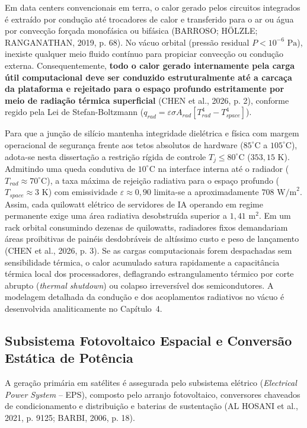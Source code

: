 Em data centers convencionais em terra, o calor gerado pelos circuitos integrados é extraído por condução até trocadores de calor e transferido para o ar ou água por convecção forçada monofásica ou bifásica (BARROSO; HÖLZLE; RANGANATHAN, 2019, p. 68). No vácuo orbital (pressão residual $P < 10^{-6}\text{ Pa}$), inexiste qualquer meio fluido contínuo para propiciar convecção ou condução externa. Consequentemente, \textbf{todo o calor gerado internamente pela carga útil computacional deve ser conduzido estruturalmente até a carcaça da plataforma e rejeitado para o espaço profundo estritamente por meio de radiação térmica superficial} (CHEN et al., 2026, p. 2), conforme regido pela Lei de Stefan-Boltzmann ($q_{rad} = \varepsilon \sigma A_{rad} [T_{rad}^4 - T_{space}^4]$).

Para que a junção de silício mantenha integridade dielétrica e física com margem operacional de segurança frente aos tetos absolutos de hardware ($85^\circ\text{C}$ a $105^\circ\text{C}$), adota-se nesta dissertação a restrição rígida de controle $T_j \le 80^\circ\text{C}$ ($353{,}15\text{ K}$). Admitindo uma queda condutiva de $10^\circ\text{C}$ na interface interna até o radiador ($T_{rad} \approx 70^\circ\text{C}$), a taxa máxima de rejeição radiativa para o espaço profundo ($T_{space} \approx 3\text{ K}$) com emissividade $\varepsilon \approx 0{,}90$ limita-se a aproximadamente $708\text{ W/m}^2$. Assim, cada quilowatt elétrico de servidores de IA operando em regime permanente exige uma área radiativa desobstruída superior a $1{,}41\text{ m}^2$. Em um rack orbital consumindo dezenas de quilowatts, radiadores fixos demandariam áreas proibitivas de painéis desdobráveis de altíssimo custo e peso de lançamento (CHEN et al., 2026, p. 3). Se as cargas computacionais forem despachadas sem sensibilidade térmica, o calor acumulado satura rapidamente a capacitância térmica local dos processadores, deflagrando estrangulamento térmico por corte abrupto (\textit{thermal shutdown}) ou colapso irreversível dos semicondutores. A modelagem detalhada da condução e dos acoplamentos radiativos no vácuo é desenvolvida analiticamente no Capítulo~4.

\subsection{Subsistema Fotovoltaico Espacial e Conversão Estática de Potência}

A geração primária em satélites é assegurada pelo subsistema elétrico (\textit{Electrical Power System} -- EPS), composto pelo arranjo fotovoltaico, conversores chaveados de condicionamento e distribuição e baterias de sustentação (AL HOSANI et al., 2021, p. 9125; BARBI, 2006, p. 18).

